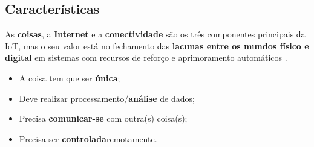 \subsection*{Características}
\begin{frame}{}
	\begin{block}{}	
		As \textbf{coisas}, a \textbf{Internet} e a \textbf{conectividade} são os três componentes principais da IoT, mas o seu valor está no fechamento das \textbf{lacunas entre os mundos físico e digital} em sistemas com recursos de reforço e aprimoramento automáticos \cite{Amazon}.
		\begin{itemize}
			\item A coisa tem que ser \textbf{única};
			\item Deve realizar processamento/\textbf{análise} de dados;
			\item Precisa \textbf{comunicar-se} com outra(s) coisa(s);
			\item Precisa ser \textbf{controlada}\footnotemark remotamente.
		\end{itemize}
	\end{block}
	
\end{frame}